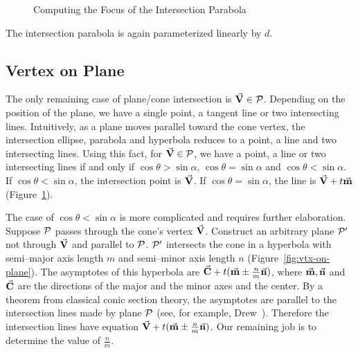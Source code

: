 \begin{figure}
\vspace{5.5cm}
\caption{Computing the Focus of the Intersection Parabola}
\label{fig:parabola}
\end{figure}

The intersection parabola is again parameterized linearly by $d$.


\subsection{Vertex on Plane}
\label{section:vertex-on-plane}

  The only remaining case of plane/cone intersection is $\vec{\bf V}\in{\cal P}$.
Depending on the position of the plane, we have a single point, a tangent line
or two intersecting lines.  Intuitively, as a plane
moves parallel toward the cone vertex, the intersection ellipse, parabola
and hyperbola reduces to a point, a line and two intersecting lines.  
Using this fact, for $\vec{\bf V}\in{\cal P}$, we have a point, a line or two 
intersecting lines if and only if $\cos\theta>\sin\alpha$, 
$\cos\theta=\sin\alpha$ and $\cos\theta<\sin\alpha$.   
If $\cos\theta<\sin\alpha$, the intersection point is $\vec{\bf V}$.
If $\cos\theta=\sin\alpha$, the line is  $\vec{\bf V}+t\vec{\bf m}$ 
(Figure~\ref{fig:parabola}).  

     The case of $\cos\theta<\sin\alpha$ is more complicated and requires 
further elaboration.  Suppose ${\cal P}$ passes through the cone's vertex 
$\vec{\bf V}$.  Construct an arbitrary plane ${\cal P}^\prime$ not through 
$\vec{\bf V}$ and parallel to ${\cal P}$.  ${\cal P}^\prime$ intersects the 
cone in a hyperbola with semi--major axis length $m$ and semi--minor axis 
length $n$ (Figure~\ref{fig:vtx-on-plane}).
The asymptotes of this hyperbola are
$\vec{\bf C}+t(\vec{\bf m}\pm\frac{n}{m}\vec{\bf n})$, where $\vec{\bf m},\vec{\bf n}$
and $\vec{\bf C}$ are the directions of the major and the minor axes and the 
center.  By a theorem from classical conic section theory,
the asymptotes are parallel to the intersection lines made by plane
${\cal P}$ (see, for example, Drew~\cite[page 119]{drew:1875}).
Therefore the intersection lines have equation
$\vec{\bf V}+t(\vec{\bf m}\pm\frac{n}{m}\vec{\bf n})$.
Our remaining job is to determine the value of $\frac{n}{m}$.

